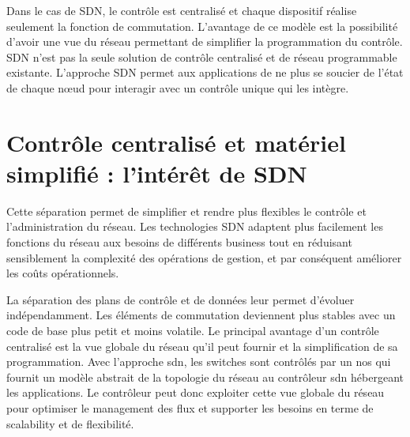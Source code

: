 Dans le cas de SDN, le contrôle est centralisé et chaque dispositif réalise seulement la fonction de commutation. L'avantage de ce modèle est la possibilité d'avoir une vue du réseau permettant de simplifier la programmation du contrôle. SDN n'est pas la seule solution de contrôle centralisé et de réseau programmable existante. L'approche SDN permet aux applications de ne plus se soucier de l'état de chaque nœud pour interagir avec un contrôle unique qui les intègre. \cite{sdnbookControlDataPlanes}





\section{Contrôle centralisé et matériel simplifié : l'intérêt de SDN}



Cette séparation permet de simplifier et rendre plus flexibles le contrôle et l'administration du réseau. Les technologies SDN adaptent plus facilement les fonctions du réseau aux besoins de différents business tout en réduisant sensiblement la complexité des opérations de gestion, et par conséquent améliorer les coûts opérationnels. \cite{sndChineseBookConceptsApplications}


La séparation des plans de contrôle et de données leur permet d'évoluer indépendamment. Les éléments de commutation deviennent plus stables avec un code de base plus petit et moins volatile. 
Le principal avantage d'un contrôle centralisé est la vue globale du réseau qu'il peut fournir et la simplification de sa  programmation. Avec l'approche \gls{sdn}, les switches sont contrôlés par un \gls{nos} qui fournit un modèle abstrait de la topologie du réseau au contrôleur \gls{sdn} hébergeant les applications. Le contrôleur peut donc exploiter cette vue globale du réseau pour optimiser le management des flux et supporter les besoins en terme de \gls{scalability} et de flexibilité. \cite{WhySDN}


